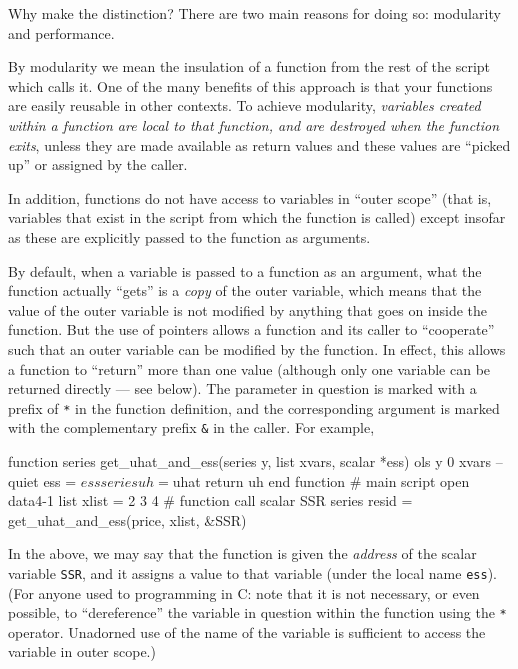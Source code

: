 Why make the distinction? There are two main reasons for doing so:
modularity and performance.

By modularity we mean the insulation of a function from the rest of
the script which calls it.  One of the many benefits of this approach
is that your functions are easily reusable in other contexts.  To
achieve modularity, \emph{variables created within a function are
  local to that function, and are destroyed when the function exits},
unless they are made available as return values and these values are
``picked up'' or assigned by the caller.
    
In addition, functions do not have access to variables in ``outer
scope'' (that is, variables that exist in the script from which the
function is called) except insofar as these are explicitly passed to
the function as arguments.

By default, when a variable is passed to a function as an argument,
what the function actually ``gets'' is a \emph{copy} of the outer
variable, which means that the value of the outer variable is not
modified by anything that goes on inside the function.  But the use of
pointers allows a function and its caller to ``cooperate'' such that
an outer variable can be modified by the function.  In effect, this
allows a function to ``return'' more than one value (although only one
variable can be returned directly --- see below).  The parameter in
question is marked with a prefix of \texttt{*} in the function
definition, and the corresponding argument is marked with the
complementary prefix \verb+&+ in the caller.  For example,
%
\begin{code}
function series get_uhat_and_ess(series y, list xvars, scalar *ess)
  ols y 0 xvars --quiet
  ess = $ess
  series uh = $uhat
  return uh
end function
# main script
open data4-1
list xlist = 2 3 4
# function call
scalar SSR
series resid = get_uhat_and_ess(price, xlist, &SSR)
\end{code}
%
In the above, we may say that the function is given the \emph{address}
of the scalar variable \texttt{SSR}, and it assigns a value to that
variable (under the local name \texttt{ess}).  (For anyone used to
programming in C: note that it is not necessary, or even possible, to
``dereference'' the variable in question within the function using the
\texttt{*} operator.  Unadorned use of the name of the variable is
sufficient to access the variable in outer scope.)

